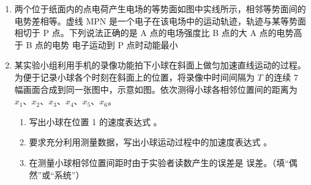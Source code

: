 \documentclass[\gkver]{gaokaozhenti}
\begin{document}
\begin{enumerate}
{D．燃气被喷出的瞬间，燃气对火箭的反作用力作用在火箭上，使火箭获得推力，故 D 错误。

故选 AB。
}

\item
两个位于纸面内的点电荷产生电场的等势面如图中实线所示，相邻等势面间的电势差相等。虚线 MPN 是一个电子在该电场中的运动轨迹，轨迹与某等势面相切于 P 点。下列说法正确的是 
{A 点的电场强度比 B 点的大}
{A 点的电势高于 B 点的电势}
{电子运动到 P 点时动能最小}


\item
某实验小组利用手机的录像功能拍下小球在斜面上做匀加速直线运动的过程。为便于记录小球各个时刻在斜面上的位置，将录像中时间间隔为 $T$ 的连续 7 幅画面合成到同一张图中，示意如图。依次测得小球各相邻位置间的距离为 $x_{1}$、$x_{2}$、$x_{3}$、$x_{4}$、$x_{5}$、$x_{6}$。


\begin{enumerate}
	\item
	写出小球在位置 1 的速度表达式 。
	\item
	要求充分利用测量数据，写出小球运动过程中的加速度表达式 。
	\item
	在测量小球相邻位置间距时由于实验者读数产生的误差是  误差。（填“偶然”或“系统”）
\end{enumerate}


\end{enumerate}
\end{document}
